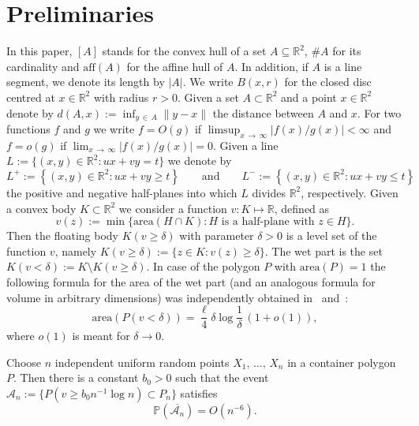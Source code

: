 \documentclass[AHL,Unicode,longabstracts,published]{cedram}
\newcommand{\bbR}{\mathbb{R}}
\newcommand{\bbP}{\mathbb{P}}
\newcommand{\clA}{\mathcal{A}}
\newcommand{\area}{\mathrm{area}}
\newcommand{\aff}{\mathrm{aff}}
\begin{document}
\section{Preliminaries}\label{sec:Prelim}

In this paper, $[A]$ stands for the convex hull of a set $A\subseteq\bbR^2$, $\# A$ for its cardinality and $\aff(A)$ for the affine hull of $A$. In addition, if $A$ is a line segment, we denote its length by $|A|$. We write $B(x,r)$ for the closed disc centred at $x\in\bbR^2$ with radius $r>0$. Given a set $A\subset \bbR^2$ and a point $x\in\bbR^2$ denote by $d(A,x):=\inf_{y\,\in\,A}\|y-x\|$ the distance between $A$ and $x$. For two functions $f$ and $g$ we write $f=O(g)$ if $\limsup_{x\,\to\,\infty}|f(x)/g(x)|<\infty$ and $f=o(g)$ if $\lim_{x\,\to\,\infty}|f(x)/g(x)|=0$. Given a line $L:=\{(x,y)\in\bbR^2\colon ux+vy=t\}$ we denote by
\[
L^+:= \left\{(x,y)\in\bbR^2\colon ux+vy\ge t\right\}\qquad \text{and}\qquad L^-:= \left\{(x,y)\in\bbR^2\colon ux+vy\leq t\right\}
\]
the positive and negative half-planes into which $L$ divides $\bbR^2$, respectively. Given a convex body $K\subset\bbR^2$ we consider a function $v:K\mapsto\bbR$, defined as
\[
v(z):=\min\{{\area}(H\cap K)\colon H\text{ is a half-plane with }z\in H\}.
\]
Then the floating body $K(v\ge \delta)$ with parameter $\delta>0$ is a level set of the function $v$, namely $K(v\ge \delta):=\{z\in K\colon v(z)\ge \delta\}$. The wet part is the set $K(v<\delta):=K\setminus K(v\ge \delta)$. In case of the polygon $P$ with ${\area}(P)=1$ the following formula for the area of the wet part (and an analogous formula for volume in arbitrary dimensions) was independently obtained in~\cite{Schu91} and~\cite{BB93}:
\begin{equation}\label{eq:wetpart}
{\area}(P(v<\delta))=\frac{\ell}{4}\delta \log \frac 1{\delta}\, (1+o(1)),
\end{equation}
where $o(1)$ is meant for $\delta\to 0$.

\begin{lemm}\label{le:floating-Pn}
Choose $n$ independent uniform random points $X_1,\,\dots,\,X_n$ in a container polygon $P$. Then there is a constant $b_0>0$ such that the event $\clA_n := \{ P(v\ge b_0 n^{-1} \log n)\subset P_{n}\}$ satisfies
\begin{equation}
\bbP(\overline{\clA_n}) =O(n^{-6}).
\end{equation}
\end{lemm}
\end{document}
